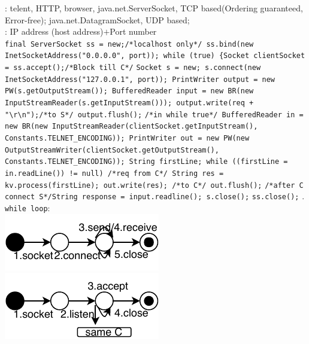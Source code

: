 \textbar
{}: 
telent, HTTP, browser, java.net.ServerSocket, TCP based(Ordering guaranteed, Error-free); 
java.net.DatagramSocket, UDP based; 
\\
: IP address (host address)$+$Port number
\\
\lstinline{final ServerSocket ss = new;/*localhost only*/ ss.bind(new InetSocketAddress("0.0.0.0", port)); while (true) {Socket clientSocket = ss.accept();/*Block till C*/}
\lstinline{Socket s = new; s.connect(new InetSocketAddress("127.0.0.1", port)); PrintWriter output = new PW(s.getOutputStream()); BufferedReader input = new BR(new InputStreamReader(s.getInputStream())); output.write(req + "\r\n");/*to S*/ output.flush();}
\lstinline{/*in while true*/ BufferedReader in = new BR(new InputStreamReader(clientSocket.getInputStream(), Constants.TELNET_ENCODING)); PrintWriter out = new PW(new OutputStreamWriter(clientSocket.getOutputStream(), Constants.TELNET_ENCODING)); String firstLine; while ((firstLine = in.readLine()) != null) /*req from C*/ String res = kv.process(firstLine); out.write(res); /*to C*/ out.flush();}
\lstinline{/*after C connect S*/String response = input.readline(); s.close();}
\lstinline{ss.close();}
  
.
  \lstinline{while loop}:
\\
\includegraphics[width=.49\linewidth]{client_FSM.pdf}
\includegraphics[width=.49\linewidth]{server_FSM.pdf}
